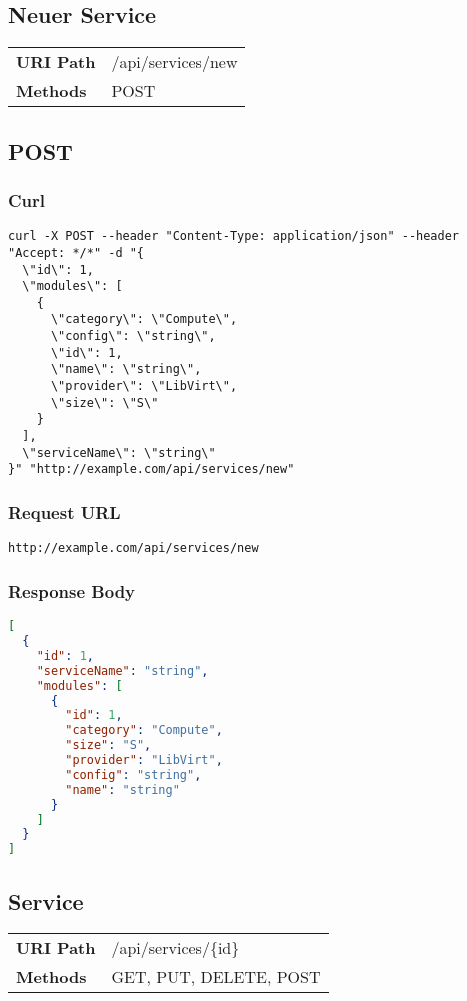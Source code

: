 \subsection{Neuer Service}
\begin{tabularx}{\linewidth}{l l}
\textbf{URI Path} & /api/services/new\\
\textbf{Methods} & POST\\
\end{tabularx}

\subsection{POST}
\subsubsection{Curl}
\begin{lstlisting}[style=Bash] 
curl -X POST --header "Content-Type: application/json" --header "Accept: */*" -d "{
  \"id\": 1,
  \"modules\": [
    {
      \"category\": \"Compute\",
      \"config\": \"string\",
      \"id\": 1,
      \"name\": \"string\",
      \"provider\": \"LibVirt\",
      \"size\": \"S\"
    }
  ],
  \"serviceName\": \"string\"
}" "http://example.com/api/services/new"
\end{lstlisting}

\subsubsection{Request URL}
\begin{lstlisting}[] 
http://example.com/api/services/new
\end{lstlisting}

\subsubsection{Response Body}
\begin{lstlisting}[language=json] 
[
  {
    "id": 1,
    "serviceName": "string",
    "modules": [
      {
        "id": 1,
        "category": "Compute",
        "size": "S",
        "provider": "LibVirt",
        "config": "string",
        "name": "string"
      }
    ]
  }
]
\end{lstlisting}





\subsection{Service}
\begin{tabularx}{\linewidth}{l l}
\textbf{URI Path} & /api/services/\{id\}\\
\textbf{Methods} & GET, PUT, DELETE, POST\\
\end{tabularx}

